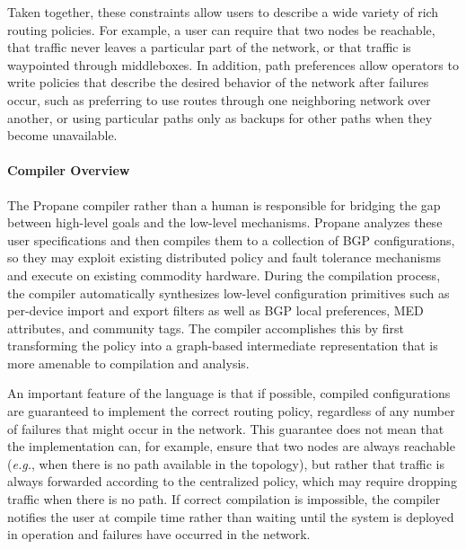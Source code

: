 \documentclass[10pt]{sig-alternate}
\newcommand{\EG}{\emph{e.g.}}
\newcommand{\sysname}{{\small \sf Propane}\xspace}
\newcommand{\para}[1]{\paragraph*{\textbf{#1}}}
\begin{document}
Taken together, these constraints allow users to describe a wide variety of rich routing policies. For example, a user can require that two nodes be reachable, that traffic never leaves a particular part of the network, or that traffic is waypointed through middleboxes. In addition, path preferences allow operators to write policies that describe the desired behavior of the network after failures occur, such as preferring to use routes through one neighboring network over another, or using particular paths only as backups for other paths when they become unavailable.


\para{Compiler Overview}

The \sysname compiler rather than a human is responsible for bridging the gap between high-level goals and the low-level mechanisms. \sysname analyzes these user specifications and then compiles them to a collection of BGP configurations, so they may exploit existing distributed policy and fault tolerance mechanisms and execute on existing commodity hardware. During the compilation process, the compiler automatically synthesizes low-level configuration primitives such as per-device import and export filters as well as BGP local preferences, MED attributes, and community tags. The compiler accomplishes this by first transforming the policy into a graph-based intermediate representation that is more amenable to compilation and analysis.

An important feature of the language is that if possible, compiled configurations are guaranteed to implement the correct routing policy, regardless of any number of failures that might occur in the network. This guarantee does not mean that the implementation can, for example, ensure that two nodes are always reachable (\EG, when there is no path available in the topology), but rather that traffic is always forwarded according to the centralized policy, which may require dropping traffic when there is no path. If correct compilation is impossible, the compiler notifies the user at compile time rather than waiting until the system is deployed in operation and failures have occurred in the network.
\end{document}
